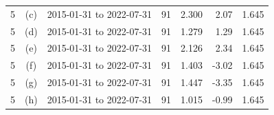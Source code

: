 \begin{table}[p]
\begin{tabular}{cccrrrr}
5 & (c) & 2015-01-31 to 2022-07-31 & 91 & 2.300 & 2.07 & 1.645\\
5 & (d) & 2015-01-31 to 2022-07-31 & 91 & 1.279 & 1.29 & 1.645\\
5 & (e) & 2015-01-31 to 2022-07-31 & 91 & 2.126 & 2.34 & 1.645\\
5 & (f) & 2015-01-31 to 2022-07-31 & 91 & 1.403 & -3.02 & 1.645\\
5 & (g) & 2015-01-31 to 2022-07-31 & 91 & 1.447 & -3.35 & 1.645\\
5 & (h) & 2015-01-31 to 2022-07-31 & 91 & 1.015 & -0.99 & 1.645\\
\hline\end{tabular}\end{table}
